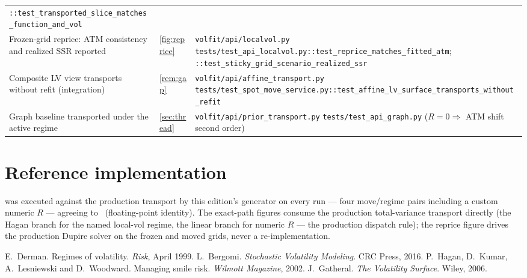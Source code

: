 \documentclass[11pt]{article}
\begin{document}
\begin{longtable}{@{}p{}p{}p{}@{}}
\nolinkurl{::test_transported_slice_matches_function_and_vol}\\
\addlinespace
Frozen-grid reprice: ATM consistency and realized SSR reported &
\cref{fig:reprice} &
\nolinkurl{volfit/api/localvol.py}\newline
\nolinkurl{tests/test_api_localvol.py::test_reprice_matches_fitted_atm};
\nolinkurl{::test_sticky_grid_scenario_realized_ssr}\\
\addlinespace
Composite LV view transports without refit (integration) &
\cref{rem:gap} &
\nolinkurl{volfit/api/affine_transport.py}\newline
\nolinkurl{tests/test_spot_move_service.py::test_affine_lv_surface_transports_without_refit}\\
\addlinespace
Graph baseline transported under the active regime &
\cref{sec:thread} &
\nolinkurl{volfit/api/prior_transport.py}\newline
\nolinkurl{tests/test_api_graph.py} ($R=0\Rightarrow$ ATM shift second
order)\\
\bottomrule
\end{longtable}
\endgroup

\section{Reference implementation}
\label{app:ref}

 was executed against the production transport by this
edition's generator on every run --- four move/regime pairs including a
custom numeric $R$ --- agreeing to \smdrefagree\ (floating-point
identity).  The exact-path figures consume the production
total-variance transport directly (the Hagan branch for the named
local-vol regime, the linear branch for numeric $R$ --- the production
dispatch rule); the reprice figure drives the production Dupire solver
on the frozen and moved grids, never a re-implementation.

\begin{thebibliography}{9}
 E.~Derman.  Regimes of volatility.
\emph{Risk}, April 1999.
 L.~Bergomi.  \emph{Stochastic Volatility
Modeling}.  CRC Press, 2016.
 P.~Hagan, D.~Kumar, A.~Lesniewski and
D.~Woodward.  Managing smile risk.  \emph{Wilmott Magazine}, 2002.
 J.~Gatheral.  \emph{The Volatility Surface}.
Wiley, 2006.
\end{thebibliography}
\end{document}
